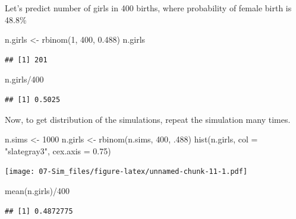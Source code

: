 \documentclass[
]{book}
\newenvironment{Shaded}{\begin{snugshade}}{\end{snugshade}}
\newcommand{\AttributeTok}[1]{\textcolor[rgb]{0.77,0.63,0.00}{#1}}
\newcommand{\DecValTok}[1]{\textcolor[rgb]{0.00,0.00,0.81}{#1}}
\newcommand{\FloatTok}[1]{\textcolor[rgb]{0.00,0.00,0.81}{#1}}
\newcommand{\FunctionTok}[1]{\textcolor[rgb]{0.00,0.00,0.00}{#1}}
\newcommand{\NormalTok}[1]{#1}
\newcommand{\OtherTok}[1]{\textcolor[rgb]{0.56,0.35,0.01}{#1}}
\newcommand{\SpecialCharTok}[1]{\textcolor[rgb]{0.00,0.00,0.00}{#1}}
\newcommand{\StringTok}[1]{\textcolor[rgb]{0.31,0.60,0.02}{#1}}
\theoremstyle{definition}
\theoremstyle{definition}
\theoremstyle{definition}
\theoremstyle{definition}
\theoremstyle{remark}
\begin{document}
Let's predict number of girls in 400 births, where probability of female birth is 48.8\%

\begin{Shaded}
\begin{Highlighting}[]
\NormalTok{n.girls }\OtherTok{\textless{}{-}} \FunctionTok{rbinom}\NormalTok{(}\DecValTok{1}\NormalTok{, }\DecValTok{400}\NormalTok{, }\FloatTok{0.488}\NormalTok{)}
\NormalTok{n.girls}
\end{Highlighting}
\end{Shaded}

\begin{verbatim}
## [1] 201
\end{verbatim}

\begin{Shaded}
\begin{Highlighting}[]
\NormalTok{n.girls}\SpecialCharTok{/}\DecValTok{400}
\end{Highlighting}
\end{Shaded}

\begin{verbatim}
## [1] 0.5025
\end{verbatim}

Now, to get distribution of the simulations, repeat the simulation many times.

\begin{Shaded}
\begin{Highlighting}[]
\NormalTok{n.sims }\OtherTok{\textless{}{-}} \DecValTok{1000}
\NormalTok{n.girls }\OtherTok{\textless{}{-}} \FunctionTok{rbinom}\NormalTok{(n.sims, }\DecValTok{400}\NormalTok{, .}\DecValTok{488}\NormalTok{)}
\FunctionTok{hist}\NormalTok{(n.girls, }\AttributeTok{col =} \StringTok{"slategray3"}\NormalTok{,  }\AttributeTok{cex.axis =} \FloatTok{0.75}\NormalTok{)}
\end{Highlighting}
\end{Shaded}

\texttt{[image: 07-Sim\_files/figure-latex/unnamed-chunk-11-1.pdf]}

\begin{Shaded}
\begin{Highlighting}[]
\FunctionTok{mean}\NormalTok{(n.girls)}\SpecialCharTok{/}\DecValTok{400}
\end{Highlighting}
\end{Shaded}

\begin{verbatim}
## [1] 0.4872775
\end{verbatim}
\end{document}
